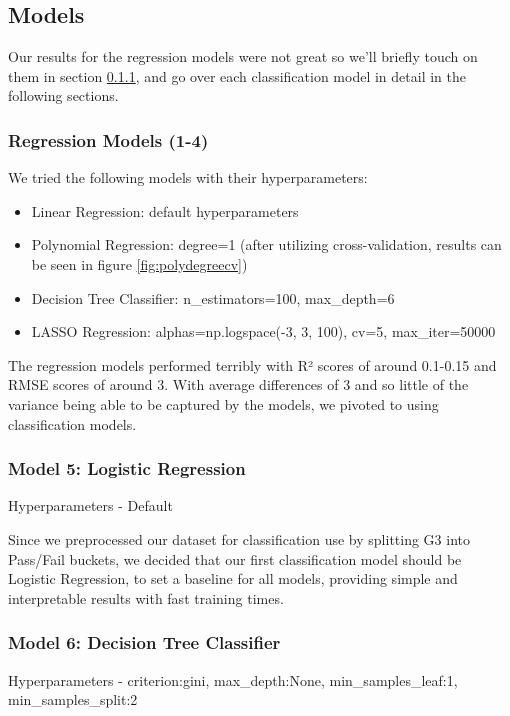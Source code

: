 \documentclass[11pt,a4paper]{article}
\begin{document}
\subsection{Models}
\label{subsec:models}
Our results for the regression models were not great so we'll briefly touch on them in section \ref{subsub:regressionmodels}, and go over each classification model in detail in the following sections.

\subsubsection{Regression Models (1-4)}
\label{subsub:regressionmodels}
We tried the following models with their hyperparameters:
\begin{itemize}
    \item Linear Regression: default hyperparameters
    \item Polynomial Regression: degree=1 (after utilizing cross-validation, results can be seen in figure \ref{fig:polydegreecv})
    \item Decision Tree Classifier: n\_estimators=100, max\_depth=6
    \item LASSO Regression: alphas=np.logspace(-3, 3, 100), cv=5, max\_iter=50000
\end{itemize}

The regression models performed terribly with R² scores of around 0.1-0.15 and RMSE scores of around 3. With average differences of 3 and so little of the variance being able to be captured by the models, we pivoted to using classification models.

\subsubsection{Model 5: Logistic Regression}
Hyperparameters - Default

Since we preprocessed our dataset for classification use by splitting G3 into Pass/Fail buckets, we decided that our first classification model should be Logistic Regression, to set a baseline for all models, providing simple and interpretable results with fast training times.

\subsubsection{Model 6: Decision Tree Classifier}
Hyperparameters - criterion:gini, max\_depth:None, min\_samples\_leaf:1, min\_samples\_split:2
\end{document}
